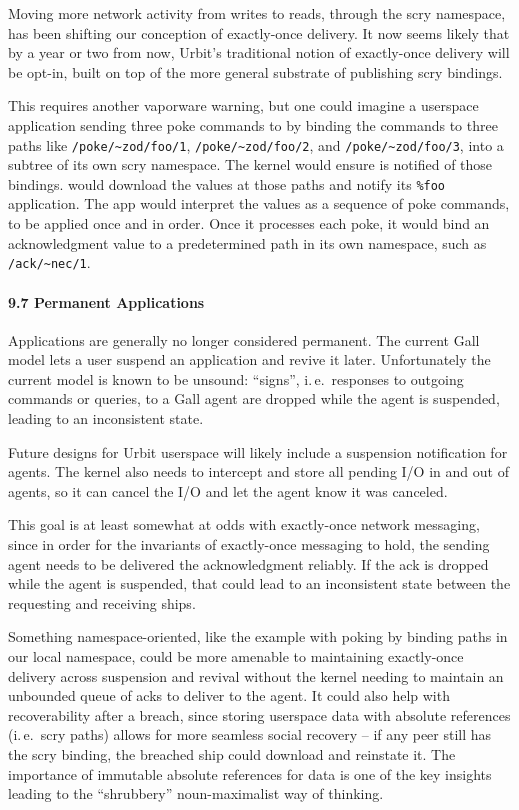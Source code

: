 \documentclass[twoside]{article}
\begin{document}
\sloppy
Moving more network activity from writes to reads, through the scry namespace, has been shifting our conception of exactly-once delivery.  It now seems likely that by a year or two from now, Urbit's traditional notion of exactly-once delivery will be opt-in, built on top of the more general substrate of publishing scry bindings.

\sloppy
This requires another vaporware warning, but one could imagine a userspace application sending three poke commands to  by binding the commands to three paths like \lstinline[style=inlinecode]{/poke/~zod/foo/1}, \lstinline[style=inlinecode]{/poke/~zod/foo/2}, and \lstinline[style=inlinecode]{/poke/~zod/foo/3}, into a subtree of its own scry namespace.  The kernel would ensure  is notified of those bindings.   would download the values at those paths and notify its \lstinline[style=inlinecode]{%foo} application.  The app would interpret the values as a sequence of poke commands, to be applied once and in order.  Once it processes each poke, it would bind an acknowledgment value to a predetermined path in its own namespace, such as \lstinline[style=inlinecode]{/ack/~nec/1}.

\paragraph{9.7 Permanent Applications}  Applications are generally no longer considered permanent.  The current Gall model lets a user suspend an application and revive it later.  Unfortunately the current model is known to be unsound: ``signs'', i.\,e.\ responses to outgoing commands or queries, to a Gall agent are dropped while the agent is suspended, leading to an inconsistent state.

Future designs for Urbit userspace will likely include a suspension notification for agents.  The kernel also needs to intercept and store all pending I/O in and out of agents, so it can cancel the I/O and let the agent know it was canceled.

This goal is at least somewhat at odds with exactly-once network messaging, since in order for the invariants of exactly-once messaging to hold, the sending agent needs to be delivered the acknowledgment reliably.  If the ack is dropped while the agent is suspended, that could lead to an inconsistent state between the requesting and receiving ships.  

Something namespace-oriented, like the example with poking  by binding paths in our local namespace, could be more amenable to maintaining exactly-once delivery across suspension and revival without the kernel needing to maintain an unbounded queue of acks to deliver to the agent.  It could also help with recoverability after a breach, since storing userspace data with absolute references (i.\,e.\ scry paths) allows for more seamless social recovery – if any peer still has the scry binding, the breached ship could download and reinstate it.  The importance of immutable absolute references for data is one of the key insights leading to the ``shrubbery'' noun-maximalist way of thinking.
\end{document}
